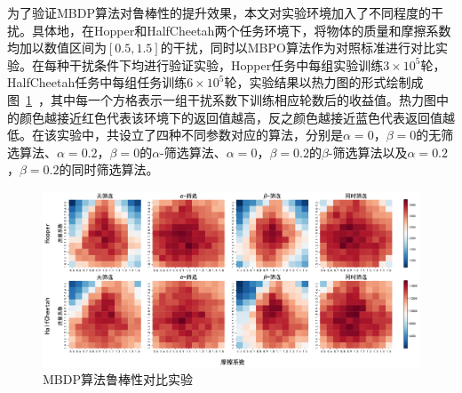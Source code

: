 为了验证MBDP算法对鲁棒性的提升效果，本文对实验环境加入了不同程度的干扰。具体地，在Hopper和HalfCheetah两个任务环境下，将物体的质量和摩擦系数均加以数值区间为$[0.5,1.5]$的干扰，同时以MBPO算法作为对照标准进行对比实验。在每种干扰条件下均进行验证实验，Hopper任务中每组实验训练$3\times 10^5$轮，HalfCheetah任务中每组任务训练$6\times 10^5$轮，实验结果以热力图的形式绘制成图~\ref{fig:robustness-heatmap}~，其中每一个方格表示一组干扰系数下训练相应轮数后的收益值。热力图中的颜色越接近红色代表该环境下的返回值越高，反之颜色越接近蓝色代表返回值越低。在该实验中，共设立了四种不同参数对应的算法，分别是$\alpha=0$，$ \beta=0$的无筛选算法、$\alpha=0.2$，$\beta=0$的$\alpha$-筛选算法、$\alpha=0$，$\beta=0.2$的$\beta$-筛选算法以及$\alpha=0.2$，$\beta=0.2$的同时筛选算法。

\begin{figure}[ht]
  \centering
  \includegraphics[width=\textwidth]{figures/robustness-heatmap.pdf}
  \caption{MBDP算法鲁棒性对比实验}
  \label{fig:robustness-heatmap}
\end{figure}

